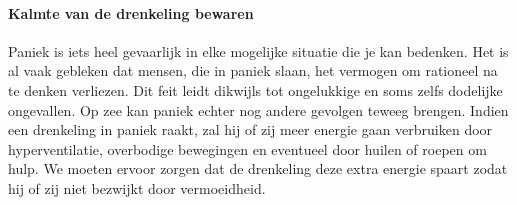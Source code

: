 \paragraph{Kalmte van de drenkeling bewaren}

Paniek is iets heel gevaarlijk in elke mogelijke situatie die je kan bedenken. Het is al vaak gebleken dat mensen, die in paniek slaan, het vermogen om rationeel na te denken verliezen. Dit feit leidt dikwijls tot ongelukkige en soms zelfs dodelijke ongevallen. Op zee kan paniek echter nog andere gevolgen teweeg brengen. Indien een drenkeling in paniek raakt, zal hij of zij meer energie gaan verbruiken door hyperventilatie, overbodige bewegingen en eventueel door huilen of roepen om hulp. We moeten ervoor zorgen dat de drenkeling deze extra energie spaart zodat hij of zij niet bezwijkt door vermoeidheid.